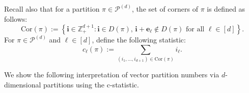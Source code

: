 \documentclass[12pt]{amsart}
\newtheorem{theorem}{Theorem}[section]
\theoremstyle{definition}
\theoremstyle{remark}
\begin{document}
Recall also that for a partition $\pi \in \mathcal{P}^{(d)}$, the set of {corners} of $\pi$ is defined as follows:
$$
\mathrm{Cor}(\pi) := \left\{\mathbf{i} \in \mathbb{Z}^{d+1}_+ : \mathbf{i} \in D(\pi),\, \mathbf{i} + \mathbf{e}_{\ell} \not\in D(\pi) \text{ for all } \ell \in [d] \right\}.
$$
For $\pi \in \mathcal{P}^{(d)}$ and $\ell \in [d]$, define the following statistic: 
$$
c_{\ell}(\pi) := \sum_{(i_1,\ldots, i_{d+1}) \in \mathrm{Cor}(\pi)} i_{\ell}.
$$

We show the following interpretation of vector partition numbers via $d$-dimensional partitions using the c-statistic.
\end{document}
